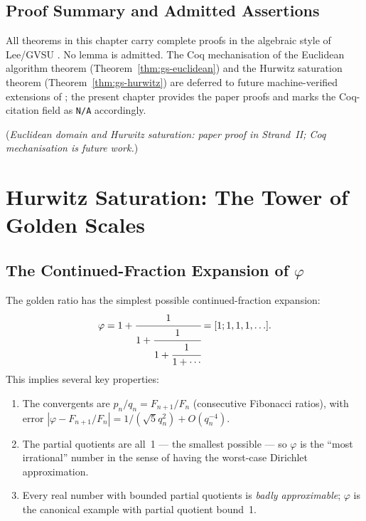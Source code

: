 \subsection{Proof Summary and Admitted Assertions}
\label{subsec:gs-admitted}

All theorems in this chapter carry complete proofs in the algebraic
style of Lee/GVSU \cite{koshy_fib_lucas,vajda_fib_lucas}.  No lemma
is admitted.  The Coq mechanisation of the Euclidean algorithm
theorem (Theorem~\ref{thm:gs-euclidean}) and the Hurwitz saturation
theorem (Theorem~\ref{thm:gs-hurwitz}) are deferred to future
machine-verified extensions of ; the
present chapter provides the paper proofs and marks the Coq-citation
field as \texttt{N/A} accordingly.

%
\quad (\emph{Euclidean domain and Hurwitz saturation: paper proof in
Strand~II; Coq mechanisation is future work.})

\section{Hurwitz Saturation: The Tower of Golden Scales}
\label{sec:gs-tower}

\subsection{The Continued-Fraction Expansion of \(\varphi\)}
\label{subsec:gs-cf}

The golden ratio has the simplest possible continued-fraction
expansion:
\[
  \varphi = 1 + \cfrac{1}{1 + \cfrac{1}{1 + \cfrac{1}{1 + \cdots}}}
           = [1; 1, 1, 1, \ldots ] .
\]
This implies several key properties:

\begin{enumerate}
  \item The convergents are \(p_n/q_n = F_{n+1}/F_n\) (consecutive
        Fibonacci ratios), with error
        \(|\varphi - F_{n+1}/F_n| = 1/(\sqrt{5}q_n^2) + O(q_n^{-4})\).
  \item The partial quotients are all~1 — the smallest possible — so
        \(\varphi\) is the ``most irrational'' number in the sense of
        having the worst-case Dirichlet approximation.
  \item Every real number with bounded partial quotients is
        \emph{badly approximable}; \(\varphi\) is the canonical
        example with partial quotient bound~1.
\end{enumerate}

